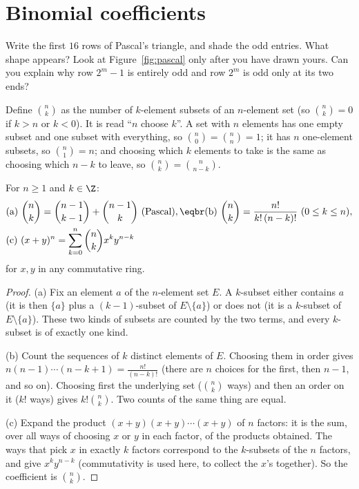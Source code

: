 \section{Binomial coefficients}

\begin{think}
Write the first $16$ rows of Pascal's triangle, and shade the odd entries. What shape appears? Look at Figure~\ref{fig:pascal} only after you have drawn yours. Can you explain why row $2^m-1$ is entirely odd and row $2^m$ is odd only at its two ends?
\end{think}

Define $\binom nk$ as the number of $k$-element subsets of an $n$-element set (so $\binom nk=0$ if $k>n$ or $k<0$). It is read ``$n$ choose $k$''.
A set with $n$ elements has one empty subset and one subset with everything, so $\binom n0=\binom nn=1$; it has $n$ one-element subsets, so
$\binom n1=n$; and choosing which $k$ elements to take is the same as choosing which $n-k$ to leave, so $\binom nk=\binom n{n-k}$.

\begin{proposition}\label{prop:binom}
For $n\ge1$ and $k\in\Z$:
\[
\begin{aligned}
&\text{(a)}\ \binom nk=\binom{n-1}{k-1}+\binom{n-1}{k}\ \text{(Pascal)},\eqbr
\text{(b)}\ \binom nk=\frac{n!}{k!\,(n-k)!}\ (0\le k\le n),\\
&\text{(c)}\ (x+y)^n=\sum_{k=0}^n\binom nk x^ky^{n-k}
\end{aligned}
\]
for $x,y$ in any commutative ring.
\end{proposition}
\begin{proof}
(a) Fix an element $a$ of the $n$-element set $E$. A $k$-subset either contains $a$ (it is then $\{a\}$ plus a $(k-1)$-subset of $E\setminus\{a\}$) or does not (it is a $k$-subset of $E\setminus\{a\}$). These two kinds of subsets are counted by the two terms, and every $k$-subset is of exactly one kind.

(b) Count the sequences of $k$ distinct elements of $E$. Choosing them in order gives $n(n-1)\cdots(n-k+1)=\frac{n!}{(n-k)!}$ (there are $n$ choices for the first, then $n-1$, and so on). Choosing first the underlying set ($\binom nk$ ways) and then an order on it ($k!$ ways) gives $k!\binom nk$. Two counts of the same thing are equal.

(c) Expand the product $(x+y)(x+y)\cdots(x+y)$ of $n$ factors: it is the sum, over all ways of choosing $x$ or $y$ in each factor, of the products obtained. The ways that pick $x$ in exactly $k$ factors correspond to the $k$-subsets of the $n$ factors, and give $x^ky^{n-k}$ (commutativity is used here, to collect the $x$'s together). So the coefficient is $\binom nk$.
\end{proof}

